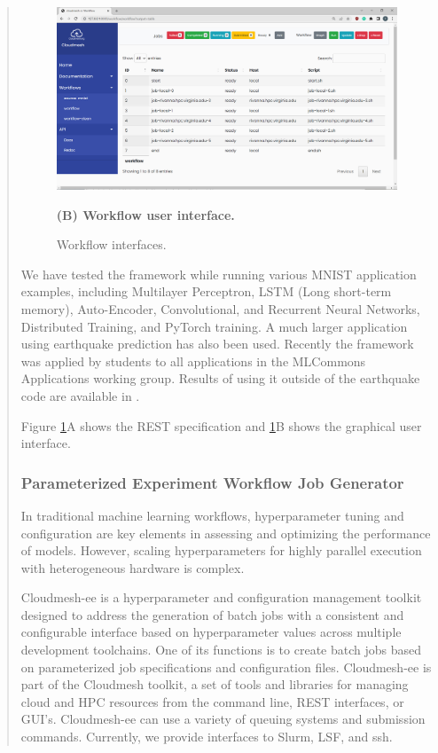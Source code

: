 \documentclass[utf8]{FrontiersinVancouver} %
\begin{document}
\begin{quote}
\begin{figure}[htb]
{    \centering\includegraphics[width=0.8\columnwidth]{images/cc-1.jpg}

    {\bf (B) Workflow user interface.}

}
  

    \caption{Workflow interfaces.}
    \label{fig:cc-3}
\end{figure}


We have tested the framework while running various MNIST application examples, including Multilayer Perceptron, LSTM (Long short-term memory), Auto-Encoder, Convolutional, and Recurrent Neural Networks, Distributed Training, and PyTorch training.  A much larger application using earthquake prediction has also been used.
Recently the framework was applied by students to all applications in the MLCommons Applications working group. Results of using it outside of the earthquake code are available in \cite{las-2023-escience}.

Figure \ref{fig:cc-3}A shows the REST specification and \ref{fig:cc-3}B shows the graphical user interface.

\subsubsection{Parameterized Experiment Workflow Job Generator}
\label{sec:workflow-ee}



In traditional machine learning workflows, hyperparameter tuning and configuration are key elements in assessing and optimizing the performance of models. However, scaling hyperparameters for highly parallel execution with heterogeneous hardware is complex.

Cloudmesh-ee \cite{cloudmesh-ee,las-2023-escience} is a hyperparameter and configuration management toolkit designed to address the generation of batch jobs with a consistent and configurable interface based on hyperparameter values across multiple development toolchains. One of its functions is to create batch jobs based on parameterized job specifications and configuration files.  Cloudmesh-ee is part of the Cloudmesh toolkit, a set of tools and libraries for managing cloud and HPC resources from the command line, REST interfaces, or GUI's.  Cloudmesh-ee can use a variety of queuing systems and submission commands. Currently, we provide interfaces to Slurm, LSF, and ssh. 


\end{quote}
\end{document}
